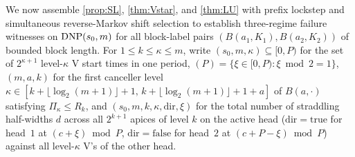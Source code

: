 We now assemble \cref{prop:SL}, \cref{thm:Vstar}, and \cref{thm:LU} with prefix lockstep and simultaneous reverse-Markov
shift selection to establish three-regime failure witnesses on $\mathrm{DNP}(s_0, m)$ for all block-label pairs
$(B(a_1, K_1), B(a_2, K_2))$ of bounded block length. For $1 \le k \le \kappa \le m$, write
$(s_0, m, \kappa) \subseteq [0, P)$ for the set of $2^{\kappa + 1}$ level-$\kappa$ V
start times in one period, $(P) = \{\xi \in [0, P) : \xi \bmod 2 = 1\}$, $(m, a, k)$
for the first canceller level $\kappa \in [k + \lfloor \log_2(m+1) \rfloor + 1,\, k + \lfloor \log_2(m+1) \rfloor + 1 + a]$
of $B(a, \cdot)$ satisfying $\Pi_\kappa \le R_k$, and $(s_0, m, k, \kappa, \mathrm{dir}, \xi)$ for
the total number of straddling half-widths $d$ across all $2^{k+1}$ apices of level $k$ on the active head ($\mathrm{dir} =
\mathrm{true}$ for head~$1$ at $(c + \xi) \bmod P$, $\mathrm{dir} = \mathrm{false}$ for head~$2$ at $(c + P - \xi) \bmod P$)
against all level-$\kappa$ V's of the other head.

